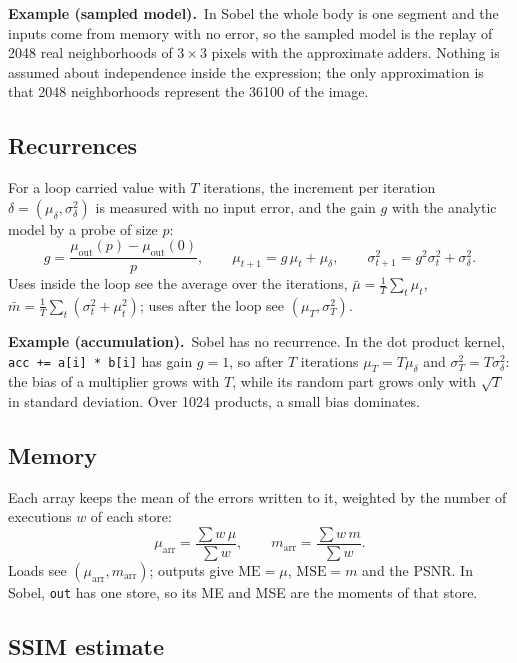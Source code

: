 \documentclass[11pt,a4paper]{article}
\newcommand{\examplebox}[2]{\par\medskip\noindent\colorbox{tabAzul!6}{\begin{minipage}{\dimexpr\linewidth-2\fboxsep}
  \textbf{Example (#1).}\ #2\end{minipage}}\par\medskip}
\begin{document}
\examplebox{sampled model}{In Sobel the whole body is one segment and the inputs come from memory with no error, so
the sampled model is the replay of 2048 real neighborhoods of $3 \times 3$ pixels with the approximate adders.
Nothing is assumed about independence inside the expression; the only approximation is that 2048 neighborhoods
represent the 36100 of the image.}

\subsection{Recurrences}

For a loop carried value with $T$ iterations, the increment per iteration $\delta = (\mu_\delta, \sigma_\delta^2)$ is
measured with no input error, and the gain $g$ with the analytic model by a probe of size $p$:
\[
  g = \frac{\mu_{\text{out}}(p) - \mu_{\text{out}}(0)}{p}, \qquad
  \mu_{t+1} = g\,\mu_t + \mu_\delta, \qquad \sigma^2_{t+1} = g^2 \sigma^2_t + \sigma^2_\delta .
\]
Uses inside the loop see the average over the iterations,
$\bar\mu = \frac{1}{T}\sum_t \mu_t$, $\bar m = \frac{1}{T}\sum_t (\sigma_t^2 + \mu_t^2)$; uses after the loop see
$(\mu_T, \sigma_T^2)$.

\examplebox{accumulation}{Sobel has no recurrence. In the dot product kernel, \texttt{acc += a[i] * b[i]} has gain
$g = 1$, so after $T$ iterations $\mu_T = T \mu_\delta$ and $\sigma_T^2 = T \sigma_\delta^2$: the bias of a multiplier
grows with $T$, while its random part grows only with $\sqrt{T}$ in standard deviation. Over 1024 products, a small
bias dominates.}

\subsection{Memory}

Each array keeps the mean of the errors written to it, weighted by the number of executions $w$ of each store:
\[
  \mu_{\text{arr}} = \frac{\sum w\, \mu}{\sum w}, \qquad m_{\text{arr}} = \frac{\sum w\, m}{\sum w}.
\]
Loads see $(\mu_{\text{arr}}, m_{\text{arr}})$; outputs give $\text{ME} = \mu$, $\text{MSE} = m$ and the PSNR.
In Sobel, \texttt{out} has one store, so its ME and MSE are the moments of that store.

\subsection{SSIM estimate}
\end{document}
